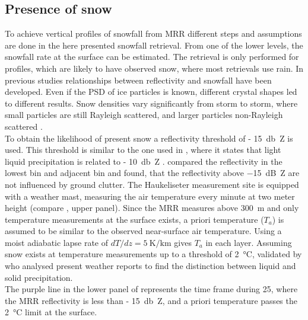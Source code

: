 \subsection{Presence of snow}\label{sec:pre_snow}

To achieve vertical profiles of snowfall from MRR different steps and assumptions are done in the here presented snowfall retrieval. From one of the lower levels, the snowfall rate at the surface can be estimated. The retrieval is only performed for profiles, which are likely to have observed snow, where most retrievals use rain. In previous studies relationships between reflectivity and snowfall have been developed. Even if the PSD of ice particles is known, different crystal shapes led to different results. Snow densities vary significantly from storm to storm, where small particles are still Rayleigh scattered, and larger particles non-Rayleigh scattered \citep{gunn_microwave_1954}. 
\\
To obtain the likelihood of present snow a reflectivity threshold of \SI{- 15}{\decibel Z} is used. This threshold is similar to the one used in \cite{wood_level_2013}, where it states that light liquid precipitation is related to \SI{- 10}{\decibel Z} \citep{stephens_properties_2007}. \cite{wood_estimation_2011} compared the reflectivity in the lowest bin and adjacent bin and found, that the reflectivity above \SI{-15}{\dB Z} are not influenced by ground clutter.
\newline
The Haukeliseter measurement site is equipped with a weather mast, measuring the air temperature every minute at two meter height (compare , upper panel). 
%
Since the MRR measures above \SI{300}{\metre} and only temperature measurements at the surface exists, a priori temperature ($T_{a}$) is assumed to be similar to the observed near-surface air temperature. Using a moist adiabatic lapse rate of $dT/dz = \SI{5}{\kelvin\per\km}$ gives $T_{a}$ in each layer. 
Assuming snow exists at temperature measurements up to a threshold of \SI{2}{\celsius}, validated by \cite{liu_g._deriving_2008} who analysed present weather reports to find the distinction between liquid and solid precipitation.\\
The purple line in the lower panel of  represents the time frame during \SI{25}{\dec}, where the MRR reflectivity is less than \SI{- 15}{\decibel Z}, and a priori temperature passes the \SI{2}{\celsius} limit at the surface.  

